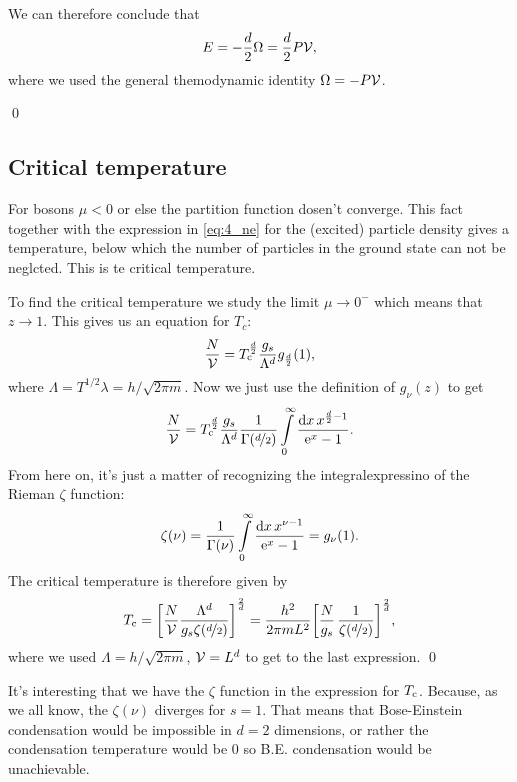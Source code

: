 \documentclass[11pt,letter, swedish, english
]{article}
\begin{document}
We can therefore conclude that
\begin{equation}\label{eq:4_E_Omega_PV}
E=-\frac{d}{2}\Omega=\frac{d}{2}P\mathcal{V},
\end{equation}
where we used the general themodynamic identity $\Omega=-P\mathcal{V}$.

\qed


\subsection{Critical temperature}

For bosons $\mu<0$ or else the partition function dosen't
converge. This fact together with the expression in \eqref{eq:4_ne}
for the (excited) particle density gives a temperature, below which
the number of particles in the ground state can not be neglcted. This
is te critical temperature. 

To find the critical temperature we study the limit $\mu\to0^-$ which
means that $z\to1$. This gives us an equation for $T_c$:
\begin{equation}
\frac{N}{\mathcal{V}}= T_{\text{c}}^{\frac{d}{2}}
\frac{g_s}{\Lambda^d} g_{\frac{d}{2}}(1),
\end{equation}
where $\Lambda=T^{1/2}\lambda=h/\sqrt{2\pi m}$. Now we just use the
definition of $g_\nu(z)$ to get
\begin{equation}
\frac{N}{\V}= \Tc^{\D{2}}
\frac{g_s}{\Lambda^d} 
\frac{1}{\Gamma(\nD{2})}
\int_0^\infty\frac{\rd{x}\, x^{\D{2}-1}}{\ee^{x}-1}.
\end{equation}
From here on, it's just a matter of recognizing the integralexpressino
of the Rieman $\zeta$ function:
\begin{equation}\label{eq:4_zeta}
\zeta(\nu)=\frac{1}{\Gamma(\nu)}\int_0^\infty
\frac{\rd{x}\,x^{\nu-1}}{\ee^{x}-1}
=g_\nu(1).
\end{equation}
The critical temperature is therefore given by
\begin{equation}
T_{\text{c}}=\qty[\frac{N}{\mathcal{V}}
\frac{\Lambda^d}{g_s\zeta(\nicefrac{d}{2})}
]^{\frac{2}{d}}
=\frac{h^2}{2\pi m L^2} \qty[
\frac{N}{g_s}\,\frac{1}
{\zeta(\nicefrac{d}{2})}
]^{\frac{2}{d}},
\end{equation}
where we used $\Lambda=h/\sqrt{2\pi m}$, $\mathcal{V}=L^d$ 
to get to the last expression. \qed

It's interesting that we have the $\zeta$ function in the expression
for $T_{\text{c}}$. Because, as we all know, the $\zeta(\nu)$ diverges for
$s=1$. That means that Bose-Einstein condensation would be impossible
in $d=2$ dimensions, or rather the condensation temperature would be
$0$ so B.E. condensation would be unachievable.
\end{document}
